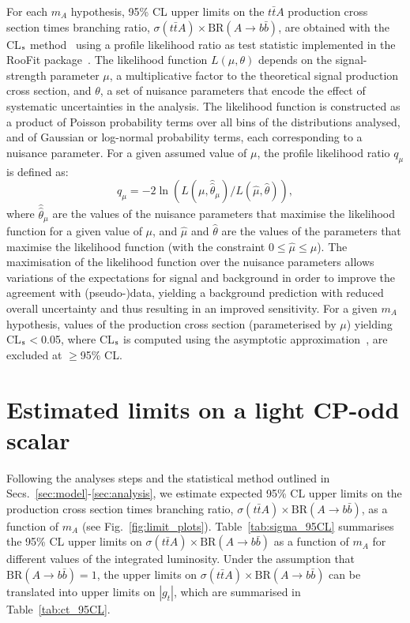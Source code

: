\documentclass[preprintnumbers,superscriptaddress,nofootinbib,aps,prd,floatfix]{revtex4}
\newcommand{\ttbar}{\ensuremath{t\bar{t}}}
\newcommand{\BR} {\ensuremath{\mathrm{BR}}}
\begin{document}
For each $m_A$ hypothesis, 95\% CL upper limits on the $\ttbar A$ production cross section times branching ratio, 
$\sigma(\ttbar A) \times \BR(A \to b\bar{b})$, are obtained with the CL$_{\rm{s}}$ method~\cite{Junk:1999kv,Read:2002hq} 
using a profile likelihood ratio as test statistic implemented in the {\sc RooFit} package~\cite{Verkerke:2003ir,RooFitManual}. 
The likelihood function $L(\mu,\theta)$ depends on 
the signal-strength parameter $\mu$,  a multiplicative factor to the theoretical signal production cross section,
and $\theta$, a set of nuisance parameters that encode the effect of systematic uncertainties in the analysis.
The likelihood function is constructed as a product of Poisson probability terms over all bins of the distributions analysed, 
and of Gaussian or log-normal probability terms, each corresponding to a nuisance parameter. 
For a given assumed value of $\mu$, the profile likelihood ratio $q_\mu$ is defined as:
\begin{equation}
q_\mu = -2\ln(L(\mu,\hat{\hat{\theta}}_\mu)/L(\hat{\mu},\hat{\theta})), 
\end{equation}
where $\hat{\hat{\theta}}_\mu$ are the values of the nuisance parameters that maximise the likelihood 
function for a given value of $\mu$, and $\hat{\mu}$ and $\hat{\theta}$ are the values of the parameters 
that maximise the likelihood function (with the constraint $0\leq \hat{\mu} \leq \mu$).
The maximisation of the likelihood function over the nuisance parameters allows variations of the expectations 
for signal and background in order to improve the agreement with (pseudo-)data, yielding a
background prediction with reduced overall uncertainty and thus resulting in an improved sensitivity.
For a given $m_A$ hypothesis, values of the production cross section (parameterised by $\mu$) yielding 
CL$_{\rm{s}}$$<$0.05, where CL$_{\rm{s}}$ is computed using the asymptotic 
approximation~\cite{Cowan:2010js}, are excluded at $\geq$95\% CL.

\section{Estimated limits on a light CP-odd scalar}
\label{sec:limit}

Following the analyses steps and the statistical method outlined in Secs.~\ref{sec:model}-\ref{sec:analysis}, we estimate expected 95\% CL upper limits
on the production cross section times branching ratio, $\sigma(\ttbar A) \times \BR(A\to b\bar{b})$, as a function of $m_A$ (see Fig.~\ref{fig:limit_plots}).
Table~\ref{tab:sigma_95CL} summarises the 95\% CL upper limits on $\sigma(\ttbar A) \times \BR(A\to b\bar{b})$ as a function of $m_A$ for different values
of the integrated luminosity. Under the assumption that $\BR(A\to b\bar{b})=1$, the upper limits on $\sigma(\ttbar A) \times \BR(A\to b\bar{b})$ 
can be translated into upper limits on $|g_t|$, which are summarised in Table~\ref{tab:ct_95CL}.
\end{document}
